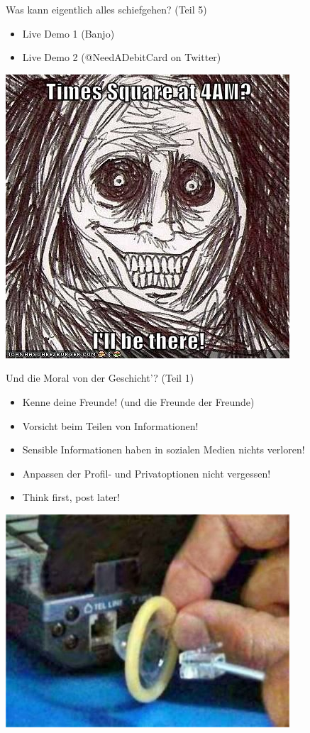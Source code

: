 \begin{frame}
	Was kann eigentlich alles schiefgehen? (Teil 5)
	\begin{itemize}
		\item Live Demo 1 (Banjo)
		\item Live Demo 2 (@NeedADebitCard on Twitter)
	\end{itemize}
	\includegraphics[scale=0.5]{socialmedia-memes/shadowlurker_meme.jpg}
\end{frame}

\begin{frame}
	Und die Moral von der Geschicht'? (Teil 1)
	\begin{itemize}
	\item Kenne deine Freunde! (und die Freunde der Freunde)
	\item Vorsicht beim Teilen von Informationen!
	\item Sensible Informationen haben in sozialen Medien nichts verloren!
	\item Anpassen der Profil- und Privatoptionen nicht vergessen!
	\item Think first, post later!
	\end{itemize}
	\includegraphics[scale=0.3]{socialmedia-memes/condom.jpg}
\end{frame}

